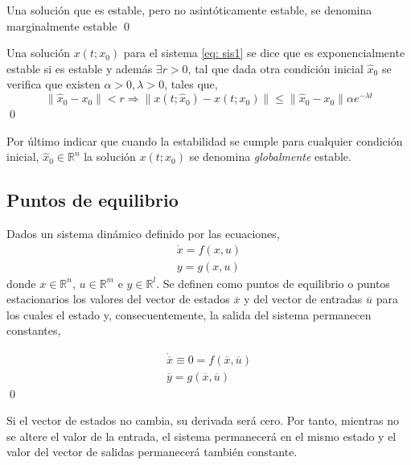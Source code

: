 \begin{definition}
Una solución que es estable, pero no asintóticamente estable, se denomina marginalmente estable
\qed
\end{definition}

\begin{definition}
Una solución $x(t;x_0)$ para el sistema \ref{eq: sis1} se dice que es exponencialmente estable si es estable y además  $\exists r>0$, tal que dada otra condición inicial $\hat x_0$ se verifica que existen $\alpha>0 , \lambda >0$, tales que,
\begin{equation}
\|\hat x_0-x_0\|<r \Rightarrow \|x(t;\hat x_0) - x(t;x_0)\| \leq \|\hat x_0 - x_0\| \alpha e^{-\lambda t}
\end{equation}
\qed
\end{definition}

Por último indicar que cuando la estabilidad se cumple para cualquier condición inicial, $\hat{x}_0  \in \mathbb{R}^n$ la solución $x(t;x_0)$ se denomina \emph{globalmente} estable.
 
\subsection{Puntos de equilibrio} 
\begin{definition} Dados un sistema dinámico definido por las ecuaciones,
\begin{align}
\dot{x} = f(x,u) \label{eq:6}\\
y = g(x,u) \label{eq:7}
\end{align}
donde $x \in \mathbb{R}^n$, $u \in \mathbb{R}^m$ e $y \in \mathbb{R}^l$. Se definen como puntos de equilibrio o puntos estacionarios los valores del vector de estados $\overline x$ y del vector de entradas $\overline u$ para los cuales el estado y, consecuentemente, la salida del sistema permanecen constantes,

\begin{align}
\dot{\overline x} \equiv 0 = f(\overline x, \overline u)\\
\overline y = g(\overline x,\overline u)
\end{align}
\qed
\end{definition}

Si el vector de estados no cambia, su derivada será cero. Por tanto, mientras no se altere el valor de la entrada, el sistema permanecerá en el mismo estado y el valor del vector de salidas permanecerá también constante. 

